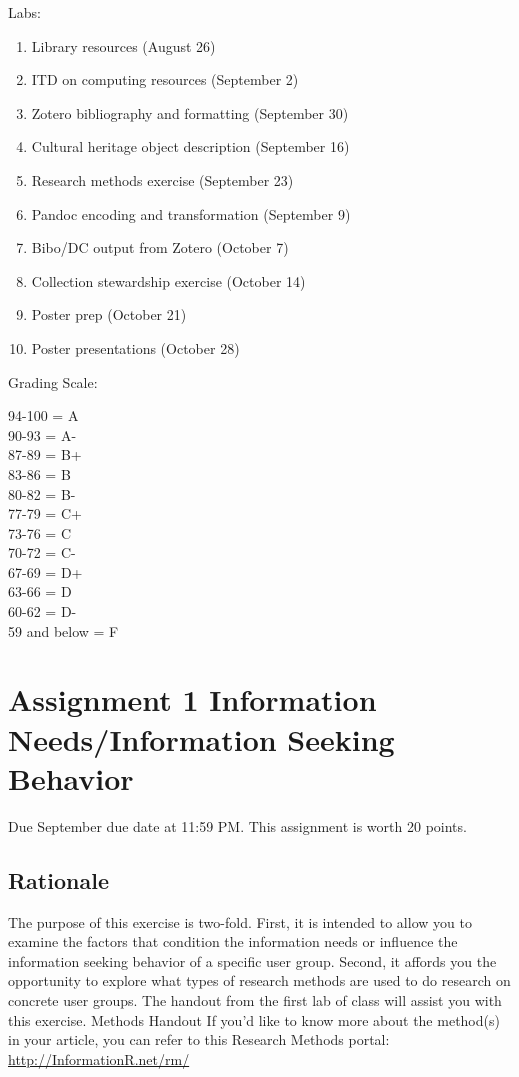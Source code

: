 \documentclass[]{article}
\providecommand{\tightlist}{%
  \setlength{\itemsep}{0pt}\setlength{\parskip}{0pt}}
\begin{document}
Labs:

\begin{enumerate}
\def\labelenumi{\arabic{enumi}.}
\tightlist
\item
  Library resources (August 26)
\item
  ITD on computing resources (September 2)
\item
  Zotero bibliography and formatting (September 30)
\item
  Cultural heritage object description (September 16)
\item
  Research methods exercise (September 23)
\item
  Pandoc encoding and transformation (September 9)
\item
  Bibo/DC output from Zotero (October 7)
\item
  Collection stewardship exercise (October 14)
\item
  Poster prep (October 21)
\item
  Poster presentations (October 28)
\end{enumerate}

Grading Scale:

94-100 = A\\
90-93 = A-\\
87-89 = B+\\
83-86 = B\\
80-82 = B-\\
77-79 = C+\\
73-76 = C\\
70-72 = C-\\
67-69 = D+\\
63-66 = D\\
60-62 = D-\\
59 and below = F

\section{Assignment 1 Information Needs/Information Seeking
Behavior}\label{Asgt1}

Due September due date at 11:59 PM. This assignment is worth 20 points.

\subsection{Rationale}\label{rationale}

The purpose of this exercise is two-fold. First, it is intended to allow
you to examine the factors that condition the information needs or
influence the information seeking behavior of a specific user group.
Second, it affords you the opportunity to explore what types of research
methods are used to do research on concrete user groups. The handout
from the first lab of class will assist you with this exercise. Methods
Handout If you'd like to know more about the method(s) in your article,
you can refer to this Research Methods portal:
\url{http://InformationR.net/rm/}
\end{document}

